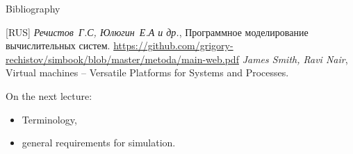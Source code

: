 \begin{frame}[allowframebreaks]{Bibliography}
\begin{thebibliography}{99}
  \bibitem{} [RUS] \textit{Речистов~Г.С, Юлюгин~Е.А и др.},
    Программное моделирование вычислительных систем.
    \url{https://github.com/grigory-rechistov/simbook/blob/master/metoda/main-web.pdf}
  \bibitem{} \textit{James Smith, Ravi Nair}, Virtual machines -- Versatile
    Platforms for Systems and Processes.
\end{thebibliography}
\end{frame}

\begin{frame}{On the next lecture:}
\begin{itemize}
\item Terminology,
\item general requirements for simulation.
\end{itemize}
\end{frame}

\finalslide


